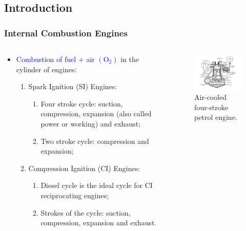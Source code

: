 \documentclass[10pt,compress]{beamer}
\begin{document}
\subsection{Introduction}
\begin{frame}
 \frametitle{Internal Combustion Engines}
  \begin{columns}
   \begin{column}[c]{0.45\linewidth}
    \begin{itemize}
     \item <1-> \textcolor{blue}{Combustion of fuel + air $\left(\text{O}_{\text{2}}\right)$} in the cylinder of engines:
     \begin{enumerate}
      \item <2-> Spark Ignition (SI) Engines:
       \begin{enumerate}
        \item <4-> Four stroke cycle: suction, compression, expansion (also called power or working) and exhaust;
        \item <5-> Two stroke cycle: compression and expansion;
       \end{enumerate}
      \item <3-> Compression Ignition (CI) Engines: 
       \begin{enumerate}
          \item <6-> Diesel cycle is the ideal cycle for CI reciprocating engines;
          \item <7-> Strokes of the cycle: suction, compression, expansion and exhaust.
       \end{enumerate}
     \end{enumerate}
    \end{itemize}
   \end{column}
   \begin{column}[c]{0.55\linewidth}
    \begin{figure}%
     \begin{center}
      \includegraphics[width=7.5cm,clip]{./Pics/InternalCombustion_4Strokes}
      \caption{Air-cooled four-stroke petrol engine.}
     \end{center}
    \end{figure}  
   \end{column}  
  \end{columns}
\end{frame}
\end{document}
